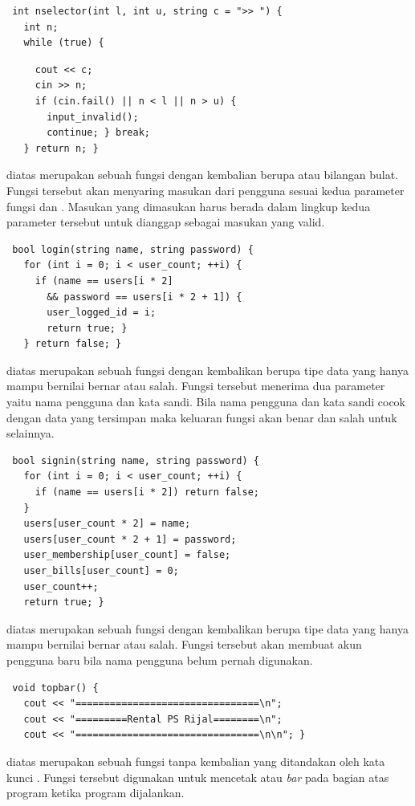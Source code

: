\documentclass[../main.tex]{subfiles}
\begin{document}
\vspace{-0.15ex}
\begin{lstlisting}
 int nselector(int l, int u, string c = ">> ") {
   int n;
   while (true) {
\end{lstlisting}
\begin{lstlisting}
     cout << c;
     cin >> n;
     if (cin.fail() || n < l || n > u) {
       input_invalid();
       continue; } break;
   } return n; }
\end{lstlisting}
    \ilz{}{\Script} diatas merupakan sebuah fungsi dengan kembalian berupa  atau bilangan bulat. Fungsi tersebut akan menyaring masukan dari pengguna sesuai kedua parameter fungsi  dan . Masukan yang dimasukan harus berada dalam lingkup kedua parameter tersebut untuk dianggap sebagai masukan yang valid.

\begin{lstlisting}
 bool login(string name, string password) {
   for (int i = 0; i < user_count; ++i) {
     if (name == users[i * 2]
       && password == users[i * 2 + 1]) {
       user_logged_id = i;
       return true; }
   } return false; }
\end{lstlisting}
    \ilz{}{\Script} diatas merupakan sebuah fungsi dengan kembalikan berupa tipe data  yang hanya mampu bernilai bernar atau salah. Fungsi tersebut menerima dua parameter yaitu nama pengguna dan kata sandi. Bila nama pengguna dan kata sandi cocok dengan data yang tersimpan maka keluaran fungsi akan benar dan salah untuk selainnya.

\begin{lstlisting}
 bool signin(string name, string password) {
   for (int i = 0; i < user_count; ++i) {
     if (name == users[i * 2]) return false;
   }
   users[user_count * 2] = name;
   users[user_count * 2 + 1] = password;
   user_membership[user_count] = false;
   user_bills[user_count] = 0;
   user_count++;
   return true; }
\end{lstlisting}
    \ilz{}{\Script} diatas merupakan sebuah fungsi dengan kembalikan berupa tipe data  yang hanya mampu bernilai bernar atau salah. Fungsi tersebut akan membuat akun pengguna baru bila nama pengguna belum pernah digunakan.

\begin{lstlisting}
 void topbar() {
   cout << "================================\n";
   cout << "=========Rental PS Rijal========\n";
   cout << "================================\n\n"; }
\end{lstlisting}
    \ilz{}{\Script} diatas merupakan sebuah fungsi tanpa kembalian yang ditandakan oleh kata kunci . Fungsi tersebut digunakan untuk mencetak {\header} atau \textit{bar} pada bagian atas program ketika program dijalankan.
\end{document}
